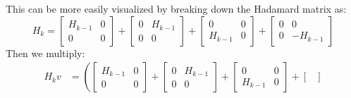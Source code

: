 \documentclass{article}
\begin{document}
\begin{itemize}
\begin{itemize}
                    \begin{answer}
                        This can be more easily visualized by breaking down the Hadamard matrix as:
                            \begin{equation*}
                                H_{k} = \begin{bmatrix}
                                    H_{k - 1} & 0 \\
                                    0         & 0   
                                \end{bmatrix} + \begin{bmatrix}
                                    0 & H_{k - 1} \\
                                    0 & 0           
                                \end{bmatrix} + \begin{bmatrix}
                                    0         & 0 \\
                                    H_{k - 1} & 0   
                                \end{bmatrix} + \begin{bmatrix}
                                    0 & 0          \\
                                    0 & -H_{k - 1}   
                                \end{bmatrix}
                            \end{equation*}
                        Then we multiply:
                            \begin{align*}
                                H_{k}v &= \left(\begin{bmatrix}
                                    H_{k - 1} & 0 \\
                                    0         & 0   
                                \end{bmatrix} + \begin{bmatrix}
                                    0 & H_{k - 1} \\
                                    0 & 0           
                                \end{bmatrix} + \begin{bmatrix}
                                    0         & 0          \\
                                    H_{k - 1} & 0   
                                \end{bmatrix} + \begin{bmatrix}

\end{bmatrix}
\end{align*}
\end{answer}
\end{itemize}
\end{itemize}
\end{document}
